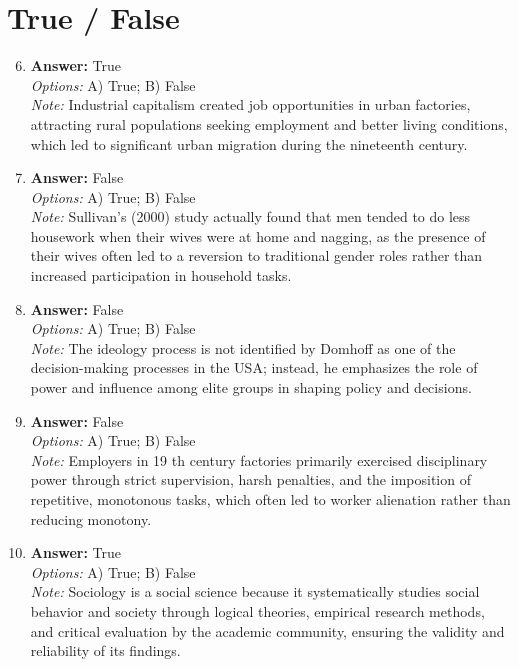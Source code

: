 \documentclass[12pt]{article}
\begin{document}
\section*{True / False}
\begin{enumerate}[label=\arabic*.]
\setcounter{enumi}{5}
\item \textbf{Answer:} True
\\ \textit{Options:} A) True; B) False
\\ \textit{Note:} Industrial capitalism created job opportunities in urban factories, attracting rural populations seeking employment and better living conditions, which led to significant urban migration during the nineteenth century.
\item \textbf{Answer:} False
\\ \textit{Options:} A) True; B) False
\\ \textit{Note:} Sullivan's (2000) study actually found that men tended to do less housework when their wives were at home and nagging, as the presence of their wives often led to a reversion to traditional gender roles rather than increased participation in household tasks.
\item \textbf{Answer:} False
\\ \textit{Options:} A) True; B) False
\\ \textit{Note:} The ideology process is not identified by Domhoff as one of the decision-making processes in the USA; instead, he emphasizes the role of power and influence among elite groups in shaping policy and decisions.
\item \textbf{Answer:} False
\\ \textit{Options:} A) True; B) False
\\ \textit{Note:} Employers in 19 th century factories primarily exercised disciplinary power through strict supervision, harsh penalties, and the imposition of repetitive, monotonous tasks, which often led to worker alienation rather than reducing monotony.
\item \textbf{Answer:} True
\\ \textit{Options:} A) True; B) False
\\ \textit{Note:} Sociology is a social science because it systematically studies social behavior and society through logical theories, empirical research methods, and critical evaluation by the academic community, ensuring the validity and reliability of its findings.
\end{enumerate}
\end{document}

